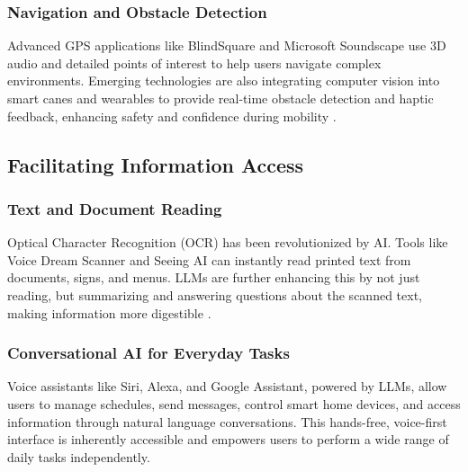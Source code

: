 \subsubsection{Navigation and Obstacle Detection}\label{ch9:sssec:navigation}
Advanced GPS applications like BlindSquare and Microsoft Soundscape use 3D audio and detailed points of interest to help users navigate complex environments. Emerging technologies are also integrating computer vision into smart canes and wearables to provide real-time obstacle detection and haptic feedback, enhancing safety and confidence during mobility \supercite{WeWALK}.

\subsection{Facilitating Information Access}\label{ch9:ssec:information-access}

\subsubsection{Text and Document Reading}\label{ch9:sssec:text-reading}
Optical Character Recognition (OCR) has been revolutionized by AI. Tools like Voice Dream Scanner and Seeing AI can instantly read printed text from documents, signs, and menus. LLMs are further enhancing this by not just reading, but summarizing and answering questions about the scanned text, making information more digestible \supercite{VoiceDreamScanner, IBMAIOCR, ABBYYAIOCR}.

\subsubsection{Conversational AI for Everyday Tasks}\label{ch9:sssec:conversational-ai}
Voice assistants like Siri, Alexa, and Google Assistant, powered by LLMs, allow users to manage schedules, send messages, control smart home devices, and access information through natural language conversations. This hands-free, voice-first interface is inherently accessible and empowers users to perform a wide range of daily tasks independently.

